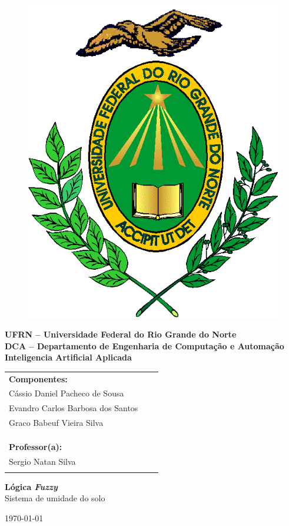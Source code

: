 	\begin{titlepage}
		
		\begin{figure}[t]
			\centering
			\includegraphics[width=0.1\linewidth]{Capa/Figuras/LOGO}
			\label{fig:LOGO}
		\end{figure}

		
		
		\begin{center}
			\textbf{UFRN – Universidade Federal do Rio Grande do Norte\\
				DCA – Departamento de Engenharia de Computação e Automação\\
				Inteligencia Artificial Aplicada
					}
		\end{center}
		
		\vspace{1.5 cm}
		
		\begin{tabular}{l l l}
			
			\textbf{Componentes:} \\
				
			Cássio Daniel Pacheco de Sousa \\
			Evandro Carlos Barbosa dos Santos \\
			Graco Babeuf Vieira Silva \\
			
	\\
	\\
	\\
			\textbf{Professor(a):}\\
			Sergio Natan Silva\\
			\vspace{4 cm}
			
		\end{tabular}
		
		\begin{center}
			{\textbf{\huge Lógica \textit{Fuzzy}}}\\
			{\large{Sistema de umidade do solo}}\\
		\end{center}
		
		\vspace{6cm}
		\begin{center}
			\today
		\end{center}
		
	\end{titlepage}